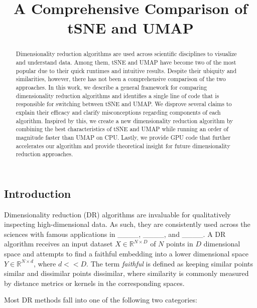 \documentclass{article}
\title{A Comprehensive Comparison of tSNE and UMAP}
\theoremstyle{definition}
\begin{document}
\maketitle

\begin{multicols}{2}

\begin{abstract}
Dimensionality reduction algorithms are used across scientific disciplines to visualize and understand data. Among them, tSNE and UMAP have become two of the most
popular due to their quick runtimes and intuitive results. Despite their ubiquity and similarities, however, there
has not been a comprehensive comparison of the two approaches. In this work, we describe a general framework for comparing dimensionality reduction algorithms and
identifies a single line of code that is responsible for switching between tSNE and UMAP. We disprove several claims to explain their efficacy and clarify
misconceptions regarding components of each algorithm. Inspired by this, we create a new dimensionality reduction algorithm by combining the best characteristics of tSNE
and UMAP while running an order of magnitude faster than UMAP on CPU. Lastly, we provide GPU code that further accelerates our algorithm and provide theoretical insight for future dimensionality reduction approaches.
\end{abstract}

\section{Introduction}
Dimensionality reduction (DR) algorithms are invaluable for qualitatively inspecting high-dimensional data. As such, they are consistently used across the sciences
with famous applications in \_\_\_\_, \_\_\_\_, and \_\_\_\_. A DR algorithm receives an input dataset $X \in \mathbb{R}^{N \times D}$ of
$N$ points in $D$ dimensional space and
attempts to find a faithful embedding into a lower dimensional space $Y \in \mathbb{R}^{N \times d}$, where $d << D$. The term \textit{faithful} is
defined as keeping similar points similar and dissimilar points dissimilar, where similarity is commonly measured by distance metrics or kernels in the corresponding spaces.

Most DR methods fall into one of the following two categories:


\end{multicols}
\end{document}
